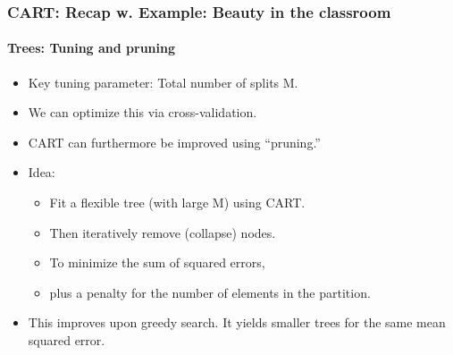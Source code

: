 \documentclass[
  shownotes,
  xcolor={svgnames},
  hyperref={colorlinks,citecolor=DarkBlue,linkcolor=DarkRed,urlcolor=DarkBlue}
  , aspectratio=169]{beamer}
\begin{document}
\begin{frame}[fragile]
\frametitle{CART: Recap w. Example: Beauty in the classroom}
\framesubtitle{Trees: Tuning and pruning}

\begin{itemize}
\item Key tuning parameter: Total number of splits M.
\item We can optimize this via cross-validation.
\item CART can furthermore be improved using “pruning.”
\item Idea:
\begin{itemize}
\item Fit a flexible tree (with large M) using CART.
\item Then iteratively remove (collapse) nodes.
\item To minimize the sum of squared errors,
\item plus a penalty for the number of elements in the partition.
\end{itemize}

\item This improves upon greedy search. It yields smaller trees for the same mean squared error.
\end{itemize}

\end{frame}
\end{document}
